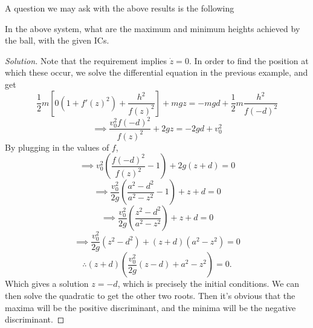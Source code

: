 A question we may ask with the above results is the following
\begin{example}
  In the above system, what are the maximum and minimum heights achieved by the
  ball, with the given ICs.
\end{example}
\begin{proof}[Solution]
  Note that the requirement implies $\dot{z}=0$. In order to find the position
  at which these occur, we solve the differential equation in the previous
  example, and get
  \[
    \frac{1}{2}m\left[ 0 (1+f'(z)^2) + \frac{h^2}{f(z)^2}\right] +mgz =
  -mgd + \frac{1}{2}m\frac{h^2}{f(-d)^2}
  \]
  \[\implies \frac{v_0^2f(-d)^2}{f(z)^2}  +2gz = -2gd + v_0^2\]
  By plugging in the values of $f$,
  \[\implies v_0^2\left( \frac{f(-d)^2}{f(z)^2}-1 \right)+2g(z+d) =0\]
  \[\implies \frac{v_0^2}{2g}\left( \frac{a^2-d^2}{a^2-z^2}-1 \right)+z+d=0\]
  \[\implies \frac{v_0^2}{2g}\left( \frac{z^2-d^2}{a^2-z^2} \right)+z+d=0\]
  \[\implies \frac{v_0^2}{2g}(z^2-d^2)+ (z+d)(a^2-z^2)=0\]
  \[\therefore (z+d)\left( \frac{v_0^2}{2g}(z-d) + a^2-z^2  \right)=0.\]
  Which gives a solution $z=-d$, which is precisely the initial conditions. We
  can then solve the quadratic to get the other two roots. Then it's obvious
  that the maxima will be the positive discriminant, and the minima will be the
  negative discriminant.
\end{proof}

